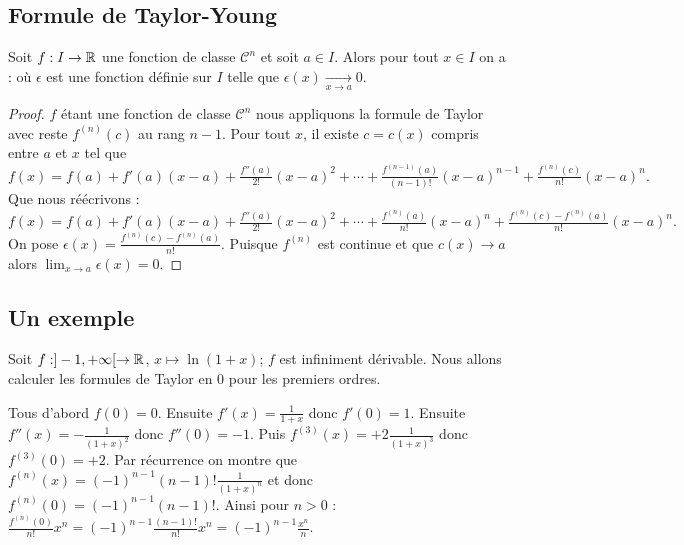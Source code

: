 \documentclass[class=report,crop=false]{standalone}
\begin{document}
\subsection{Formule de Taylor-Young}

\begin{theoreme}
Soit $f: I \to \mathbb{R}$ une fonction de classe $\mathcal{C}^n$ et soit $a\in I$.
Alors pour tout $x \in I$ on a :
où $\epsilon$ est une fonction définie sur $I$ telle que $\epsilon(x) \xrightarrow[x\to a]{} 0$.
\end{theoreme}

\begin{proof}
$f$ étant une fonction de classe $\mathcal{C}^n$ nous appliquons la formule de Taylor avec reste $f^{(n)}(c)$
au rang $n-1$. Pour tout $x$, il existe $c=c(x)$ compris entre $a$ et $x$ tel que
$f(x)=f(a)+f'(a)(x-a)+\frac{f''(a)}{2!}(x-a)^2+\cdots
+\frac{f^{(n-1)}(a)}{(n-1)!}(x-a)^{n-1} +\frac{f^{(n)}(c)}{n!}(x-a)^{n}.$
Que nous réécrivons :
$f(x)=f(a)+f'(a)(x-a)+\frac{f''(a)}{2!}(x-a)^2+\cdots
+\frac{f^{(n)}(a)}{n!}(x-a)^n + \frac{f^{(n)}(c)-f^{(n)}(a)}{n!}(x-a)^{n}.$
On pose $\epsilon(x)=\frac{f^{(n)}(c)-f^{(n)}(a)}{n!}$.
Puisque $f^{(n)}$ est continue et que $c(x) \to a$ alors $\lim_{x\to a} \epsilon(x) = 0$.
\end{proof}


\subsection{Un exemple}

Soit $f : ]-1,+\infty[ \to \mathbb{R}$, $x \mapsto \ln(1+x)$; $f$ est infiniment dérivable.
Nous allons calculer les formules de Taylor en $0$ pour les premiers ordres.

Tous d'abord $f(0)=0$. Ensuite $f'(x)=\frac{1}{1+x}$ donc $f'(0)=1$.
Ensuite $f''(x) = -\frac{1}{(1+x)^2}$ donc $f''(0)=-1$.
Puis $f^{(3)}(x)= + 2 \frac{1}{(1+x)^3}$ donc $f^{(3)}(0)= + 2$.
Par récurrence on montre que $f^{(n)}(x) = (-1)^{n-1} (n-1)!\frac{1}{(1+x)^n}$
et donc $f^{(n)}(0)= (-1)^{n-1} (n-1)!$.
Ainsi pour $n>0$ : $\frac{f^{(n)}(0)}{n!}x^n =  (-1)^{n-1} \frac{(n-1)!}{n!} x^n= (-1)^{n-1}\frac{x^n}{n}$.
\end{document}
